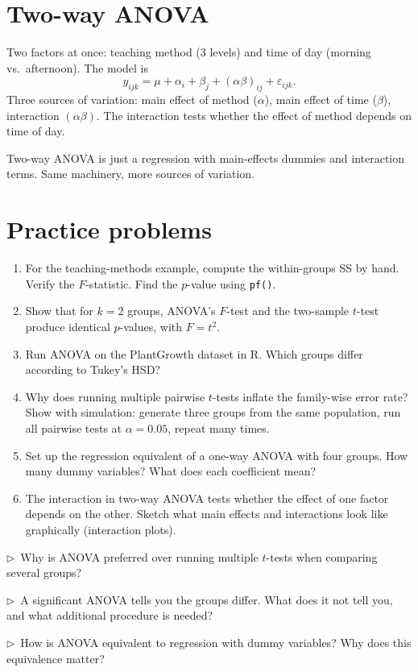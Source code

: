 \section{Two-way ANOVA}

Two factors at once: teaching method (3 levels) and time of day (morning vs.\ afternoon). The model is
\[
  y_{ijk} = \mu + \alpha_i + \beta_j + (\alpha\beta)_{ij} + \varepsilon_{ijk}.
\]
Three sources of variation: main effect of method ($\alpha$), main effect of time ($\beta$), interaction $(\alpha\beta)$. The interaction tests whether the effect of method depends on time of day.

Two-way ANOVA is just a regression with main-effects dummies and interaction terms. Same machinery, more sources of variation.

\section{Practice problems}

\begin{enumerate}
  \item For the teaching-methods example, compute the within-groups SS by hand. Verify the $F$-statistic. Find the $p$-value using \texttt{pf()}.
  \item Show that for $k = 2$ groups, ANOVA's $F$-test and the two-sample $t$-test produce identical $p$-values, with $F = t^2$.
  \item Run ANOVA on the PlantGrowth dataset in R. Which groups differ according to Tukey's HSD?
  \item Why does running multiple pairwise $t$-tests inflate the family-wise error rate? Show with simulation: generate three groups from the same population, run all pairwise tests at $\alpha = 0.05$, repeat many times.
  \item Set up the regression equivalent of a one-way ANOVA with four groups. How many dummy variables? What does each coefficient mean?
  \item The interaction in two-way ANOVA tests whether the effect of one factor depends on the other. Sketch what main effects and interactions look like graphically (interaction plots).
\end{enumerate}

\begin{reflect}
$\triangleright$~Why is ANOVA preferred over running multiple $t$-tests when comparing several groups?

\smallskip
$\triangleright$~A significant ANOVA tells you the groups differ. What does it not tell you, and what additional procedure is needed?

\smallskip
$\triangleright$~How is ANOVA equivalent to regression with dummy variables? Why does this equivalence matter?
\end{reflect}
